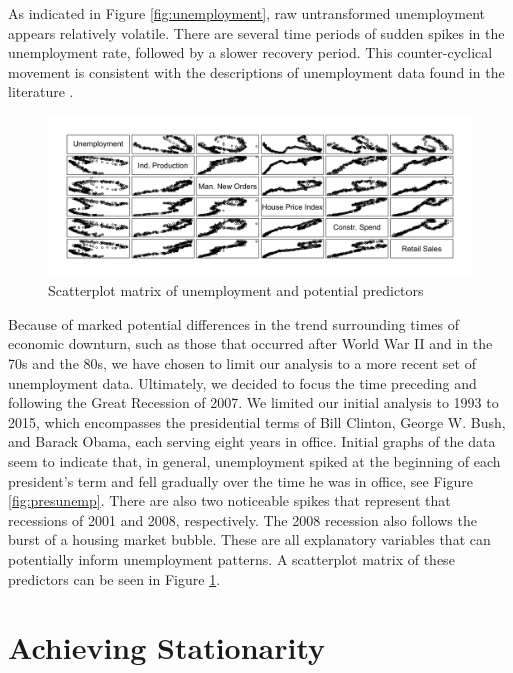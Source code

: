 \documentclass[twoside,twocolumn]{article}
\begin{document}
As indicated in Figure  \ref{fig:unemployment}, raw untransformed unemployment appears relatively volatile.  There are several time periods of sudden spikes in the unemployment rate, followed by a slower recovery period. This counter-cyclical movement is consistent with the descriptions of unemployment data found in the literature \citep{katz2010, Montgomery1998, shimer2012reassessing}.

		\begin{figure}[htb]
		\caption{Scatterplot matrix of unemployment and potential predictors}
		\label{fig:pred_scatt}
		\includegraphics[width=\linewidth]{images/pred_scatt}
	\end{figure}

Because of marked potential differences in the trend surrounding times of economic downturn, such as those that occurred after World War II and in the 70s and the 80s, we have chosen to limit our analysis to a more recent set of unemployment data. Ultimately, we decided to focus the time preceding and following the Great Recession of 2007. We limited our initial analysis to 1993 to 2015, which encompasses the presidential terms of Bill Clinton, George W. Bush, and Barack Obama, each serving eight years in office.  Initial graphs of the data seem to indicate that, in general, unemployment spiked at the beginning of each president's term and fell gradually over the time he was in office, see Figure \ref{fig:presunemp}. There are also two noticeable spikes that represent that recessions of 2001 and 2008, respectively.  The 2008 recession also follows the burst of a housing market bubble.  These are all explanatory variables that can potentially inform unemployment patterns. A scatterplot matrix  of these predictors can be seen in Figure \ref{fig:pred_scatt}.


\section{Achieving Stationarity}
\end{document}
